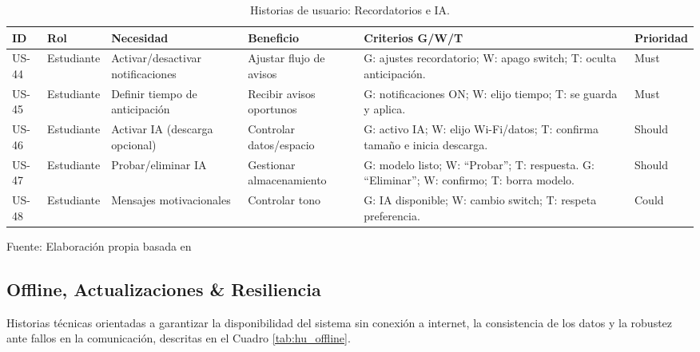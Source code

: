 \begin{table}[H]
\centering
\begin{tabularx}{\linewidth}{@{}P{1.15cm}P{2.3cm}XP{2.3cm}XP{1.2cm}@{}}
\toprule
ID & Rol & Necesidad & Beneficio & Criterios G/W/T & Prioridad \\
\midrule
US-44 & Estudiante & Activar/desactivar notificaciones & Ajustar flujo de avisos & G: ajustes recordatorio; W: apago switch; T: oculta anticipación. & Must \\
US-45 & Estudiante & Definir tiempo de anticipación & Recibir avisos oportunos & G: notificaciones ON; W: elijo tiempo; T: se guarda y aplica. & Must \\
US-46 & Estudiante & Activar IA (descarga opcional) & Controlar datos/espacio & G: activo IA; W: elijo Wi-Fi/datos; T: confirma tamaño e inicia descarga. & Should \\
US-47 & Estudiante & Probar/eliminar IA & Gestionar almacenamiento & G: modelo listo; W: ``Probar''; T: respuesta. G: ``Eliminar''; W: confirmo; T: borra modelo. & Should \\
US-48 & Estudiante & Mensajes motivacionales & Controlar tono & G: IA disponible; W: cambio switch; T: respeta preferencia. & Could \\
\bottomrule
\end{tabularx}
\caption{Historias de usuario: Recordatorios e IA.}\label{tab:hu_recordatorios}
Fuente: Elaboración propia basada en \cite{encuesta_fcyt_2025}
\end{table}

\medskip

\subsection{Offline, Actualizaciones \& Resiliencia}

Historias técnicas orientadas a garantizar la disponibilidad del sistema sin conexión a internet, la consistencia de los datos y la robustez ante fallos en la comunicación, descritas en el Cuadro \ref{tab:hu_offline}.

